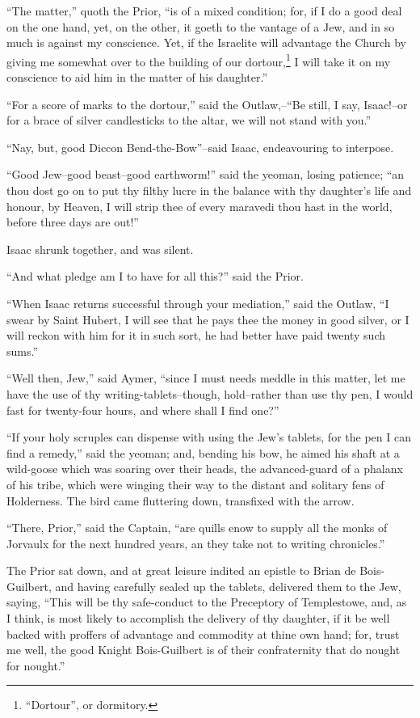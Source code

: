 ``The matter,'' quoth the Prior, ``is of a mixed condition; for, if I do
a good deal on the one hand, yet, on the other, it goeth to the vantage
of a Jew, and in so much is against my conscience. Yet, if the Israelite
will advantage the Church by giving me somewhat over to the building of
our dortour,\footnote{``Dortour'', or dormitory.} I will take it on my
conscience to aid him in the
matter of his daughter.''

``For a score of marks to the dortour,'' said the Outlaw,--``Be still, I
say, Isaac!--or for a brace of silver candlesticks to the altar, we will
not stand with you.''

``Nay, but, good Diccon Bend-the-Bow''--said Isaac, endeavouring to
interpose.

``Good Jew--good beast--good earthworm!'' said the yeoman, losing
patience; ``an thou dost go on to put thy filthy lucre in the balance
with thy daughter's life and honour, by Heaven, I will strip thee of
every maravedi thou hast in the world, before three days are out!''

Isaac shrunk together, and was silent.

``And what pledge am I to have for all this?'' said the Prior.

``When Isaac returns successful through your mediation,'' said the
Outlaw, ``I swear by Saint Hubert, I will see that he pays thee the
money in good silver, or I will reckon with him for it in such sort, he
had better have paid twenty such sums.''

``Well then, Jew,'' said Aymer, ``since I must needs meddle in this
matter, let me have the use of thy writing-tablets--though, hold--rather
than use thy pen, I would fast for twenty-four hours, and where shall I
find one?''

``If your holy scruples can dispense with using the Jew's tablets, for
the pen I can find a remedy,'' said the yeoman; and, bending his bow, he
aimed his shaft at a wild-goose which was soaring over their heads, the
advanced-guard of a phalanx of his tribe, which were winging their way
to the distant and solitary fens of Holderness. The bird came fluttering
down, transfixed with the arrow.

``There, Prior,'' said the Captain, ``are quills enow to supply all the
monks of Jorvaulx for the next hundred years, an they take not to
writing chronicles.''

The Prior sat down, and at great leisure indited an epistle to Brian de
Bois-Guilbert, and having carefully sealed up the tablets, delivered
them to the Jew, saying, ``This will be thy safe-conduct to the
Preceptory of Templestowe, and, as I think, is most likely to accomplish
the delivery of thy daughter, if it be well backed with proffers of
advantage and commodity at thine own hand; for, trust me well, the good
Knight Bois-Guilbert is of their confraternity that do nought for
nought.''

